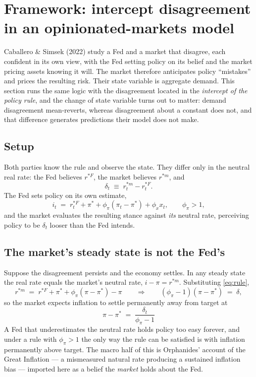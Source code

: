 \section{Framework: intercept disagreement in an opinionated-markets model}
\label{sec:framework}

Caballero \& Simsek (2022) study a Fed and a market that disagree, each confident in its own
view, with the Fed setting policy on its belief and the market pricing assets knowing it will.
The market therefore anticipates policy ``mistakes'' and prices the resulting risk. Their state
variable is aggregate demand. This section runs the same logic with the disagreement located in
the \emph{intercept of the policy rule}, and the change of state variable turns out to matter:
demand disagreement mean-reverts, whereas disagreement about a constant does not, and that
difference generates predictions their model does not make.

\subsection{Setup}

Both parties know the rule and observe the state. They differ only in the neutral real rate:
the Fed believes $r^{*F}$, the market believes $r^{*m}$, and
\begin{equation}
\delta_t \;\equiv\; r^{*m}_t - r^{*F}_t .
\label{eq:delta}
\end{equation}
The Fed sets policy on its own estimate,
\begin{equation}
i_t \;=\; r^{*F}_t + \pi^{*} + \phi_\pi\!\left(\pi_t - \pi^{*}\right) + \phi_x x_t ,
\qquad \phi_\pi > 1 ,
\label{eq:rule}
\end{equation}
and the market evaluates the resulting stance against \emph{its} neutral rate, perceiving policy
to be $\delta_t$ looser than the Fed intends.

\subsection{The market's steady state is not the Fed's}

Suppose the disagreement persists and the economy settles. In any steady state the real rate
equals the market's neutral rate, $i - \pi = r^{*m}$. Substituting \eqref{eq:rule},
\[
r^{*m} \;=\; r^{*F} + \pi^{*} + \phi_\pi(\pi-\pi^{*}) - \pi
\qquad\Longrightarrow\qquad
\left(\phi_\pi-1\right)\left(\pi-\pi^{*}\right) \;=\; \delta ,
\]
so the market expects inflation to settle permanently away from target at
\begin{equation}
\boxed{\;\pi - \pi^{*} \;=\; \frac{\delta_t}{\phi_\pi - 1}\;}
\label{eq:bias}
\end{equation}
A Fed that underestimates the neutral rate holds policy too easy forever, and under a rule with
$\phi_\pi>1$ the only way the rule can be satisfied is with inflation permanently above target.
The macro half of this is Orphanides' account of the Great Inflation --- a mismeasured natural
rate producing a sustained inflation bias --- imported here as a belief the \emph{market} holds
about the Fed.

